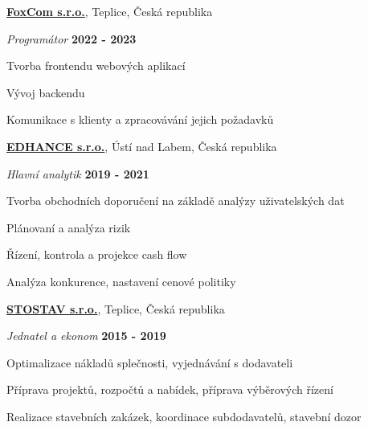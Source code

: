 \documentclass[10pt]{article}
\newenvironment{outerlist}[0]%
        {\begin{itemize}}
	{\end{itemize}
         \vspace{-.6\baselineskip}}
\newenvironment{innerlist}[0]%
        {\begin{compactitem}}
	{\end{compactitem}}
\newcommand{\blankline}{\quad\pagebreak[2]}
\begin{document}
\href{http://www.foxcom.eu}{\textbf{FoxCom s.r.o.}}, 
Teplice, Česká republika

\begin{outerlist}
	\item[] \textit{Programátor}%
		\hfill \textbf{2022 - 2023}
	\begin{innerlist}
		\item Tvorba frontendu webových aplikací
		\item Vývoj backendu
		\item Komunikace s klienty a zpracovávání jejich požadavků		
		
	\end{innerlist}
\end{outerlist}
\blankline


\href{http://www.edhance.cz}{\textbf{EDHANCE s.r.o.}}, 
Ústí nad Labem, Česká republika

\begin{outerlist}
	\item[] \textit{Hlavní analytik}%
		\hfill \textbf{2019 - 2021}
	\begin{innerlist}
		\item Tvorba obchodních doporučení na základě analýzy uživatelských dat
		\item Plánovaní a analýza rizik
		\item Řízení, kontrola a projekce cash flow
		\item Analýza konkurence, nastavení cenové politiky
		
	\end{innerlist}
\end{outerlist}
\blankline


\href{http://www.stostav.cz}{\textbf{STOSTAV s.r.o.}}, 
Teplice, Česká republika

\begin{outerlist}
	\item[] \textit{Jednatel a ekonom}%
		\hfill \textbf{2015 - 2019}
	\begin{innerlist}
		\item Optimalizace nákladů splečnosti, vyjednávání s dodavateli
		\item Příprava projektů, rozpočtů a nabídek, příprava výběrových řízení
		\item Realizace stavebních zakázek, koordinace subdodavatelů, stavební dozor		
	\end{innerlist}
\end{outerlist}
\blankline
\end{document}
